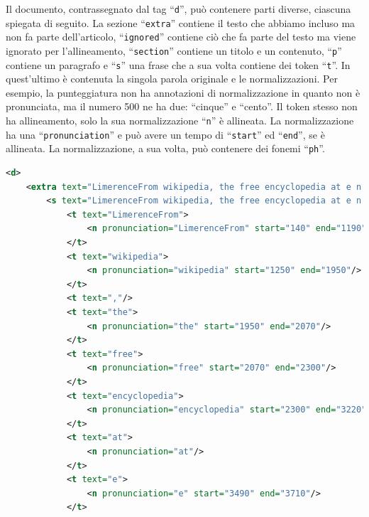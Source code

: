 \documentclass[12pt,a4paper,titlepage]{article}
\begin{document}
Il documento, contrassegnato dal tag ``\texttt{d}'', può contenere parti diverse, ciascuna spiegata di seguito. La sezione ``\texttt{extra}'' contiene il testo che abbiamo incluso ma non fa parte dell'articolo, ``\texttt{ignored}'' contiene ciò che fa parte del testo ma viene ignorato per l'allineamento, ``\texttt{section}'' contiene un titolo e un contenuto, ``\texttt{p}'' contiene un paragrafo  e ``\texttt{s}'' una frase che a sua volta contiene dei token ``\texttt{t}''. In quest'ultimo è contenuta la singola parola originale e le normalizzazioni. Per esempio, la punteggiatura non ha annotazioni di normalizzazione in quanto non è pronunciata, ma il numero 500 ne ha due: ``cinque'' e ``cento''. Il token stesso non ha allineamento, solo la sua normalizzazione ``\texttt{n}'' è allineata. La normalizzazione ha una ``\texttt{pronunciation}'' e può avere un tempo di ``\texttt{start}'' ed ``\texttt{end}'', se è allineata. La normalizzazione, a sua volta, può contenere dei fonemi ``\texttt{ph}''.

\begin{lstlisting}[language=XML,firstnumber=1, caption=Annotazioni delle parole in un audio, label=annotazioni,captionpos=b]
<d>
	<extra text="LimerenceFrom wikipedia, the free encyclopedia at e n dot wikipedia dot org.">
		<s text="LimerenceFrom wikipedia, the free encyclopedia at e n dot wikipedia dot org.">
			<t text="LimerenceFrom">
				<n pronunciation="LimerenceFrom" start="140" end="1190"/>
			</t>
			<t text="wikipedia">
				<n pronunciation="wikipedia" start="1250" end="1950"/>
			</t>
			<t text=","/>
			<t text="the">
				<n pronunciation="the" start="1950" end="2070"/>
			</t>
			<t text="free">
				<n pronunciation="free" start="2070" end="2300"/>
			</t>
			<t text="encyclopedia">
				<n pronunciation="encyclopedia" start="2300" end="3220"/>
			</t>
			<t text="at">
				<n pronunciation="at"/>
			</t>
			<t text="e">
				<n pronunciation="e" start="3490" end="3710"/>
			</t>
\end{lstlisting}
\end{document}
